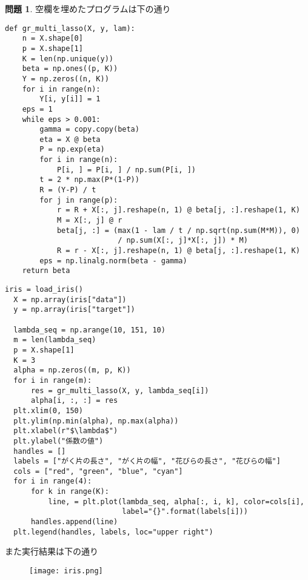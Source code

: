 \documentclass{jsarticle}
\theoremstyle{definition}
\newtheorem{Ex}{問題}
\theoremstyle{mystyle} %
\renewcommand{\footnotesize}{\normalsize}
\begin{document}
\begin{Ex}
  空欄を埋めたプログラムは下の通り
  \begin{lstlisting}[basicstyle = \ttfamily\footnotesize, frame = single]
  def gr_multi_lasso(X, y, lam):
    n = X.shape[0]
    p = X.shape[1]
    K = len(np.unique(y))
    beta = np.ones((p, K))
    Y = np.zeros((n, K))
    for i in range(n):
        Y[i, y[i]] = 1
    eps = 1
    while eps > 0.001:
        gamma = copy.copy(beta)
        eta = X @ beta
        P = np.exp(eta)
        for i in range(n):
            P[i, ] = P[i, ] / np.sum(P[i, ])
        t = 2 * np.max(P*(1-P))
        R = (Y-P) / t
        for j in range(p):
            r = R + X[:, j].reshape(n, 1) @ beta[j, :].reshape(1, K)
            M = X[:, j] @ r
            beta[j, :] = (max(1 - lam / t / np.sqrt(np.sum(M*M)), 0)
                          / np.sum(X[:, j]*X[:, j]) * M)
            R = r - X[:, j].reshape(n, 1) @ beta[j, :].reshape(1, K)
        eps = np.linalg.norm(beta - gamma)
    return beta
\end{lstlisting}


\begin{lstlisting}[basicstyle = \ttfamily\footnotesize, frame = single]
  iris = load_iris()
  X = np.array(iris["data"])
  y = np.array(iris["target"])
  
  lambda_seq = np.arange(10, 151, 10)
  m = len(lambda_seq)
  p = X.shape[1]
  K = 3
  alpha = np.zeros((m, p, K))
  for i in range(m):
      res = gr_multi_lasso(X, y, lambda_seq[i])
      alpha[i, :, :] = res
  plt.xlim(0, 150)
  plt.ylim(np.min(alpha), np.max(alpha))
  plt.xlabel(r"$\lambda$")
  plt.ylabel("係数の値")
  handles = []
  labels = ["がく片の長さ", "がく片の幅", "花びらの長さ", "花びらの幅"]
  cols = ["red", "green", "blue", "cyan"]
  for i in range(4):
      for k in range(K):
          line, = plt.plot(lambda_seq, alpha[:, i, k], color=cols[i],
                           label="{}".format(labels[i]))
      handles.append(line)
  plt.legend(handles, labels, loc="upper right")
\end{lstlisting}
また実行結果は下の通り
\begin{figure}[H]
\texttt{[image: iris.png]}
 \end{figure}
\end{Ex}
\end{document}
